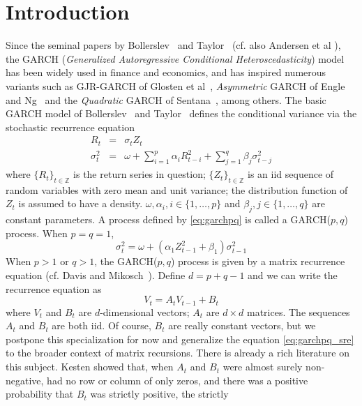 \section{Introduction}
Since the seminal papers by Bollerslev~\cite{bollerslev:1986} and 
Taylor~\cite{taylor:2008} (cf. also Andersen et al
\cite{andersen:davis:kreiss:mikosch:2009}), the GARCH 
({\em Generalized Autoregressive Conditional Heteroscedasticity}) model
has been widely used in finance and economics, and has
inspired numerous variants such as GJR-GARCH of Glosten et
al~\cite{glosten:1993}, {\em Asymmetric} GARCH of Engle and
Ng~\cite{engle:Ng:1993} and the {\em Quadratic} GARCH of
Sentana~\cite{sentana:1995}, among others. The basic GARCH model of
Bollerslev~\cite{bollerslev:1986} and Taylor~\cite{taylor:2008}
defines the conditional variance via the stochastic recurrence
equation
\begin{eqnarray}
  R_t &=& \sigma_t Z_t \nonumber \\
  \sigma_{t}^2 &=& \omega + \sum_{i=1}^p \alpha_i R_{t-i}^2 +
  \sum_{j=1}^q \beta_j \sigma_{t-j}^2   \label{eq:garchpq}
\end{eqnarray}
where $\{R_t\}_{t \in \mathbb Z}$ is the return series in question;
$\{Z_t\}_{t \in \mathbb Z}$ is an iid sequence of random variables
with zero mean and unit variance; the distribution function of $Z_t$
is assumed to have a density.
$\omega, \alpha_i, i \in \{1,\dots,p\}$ and
$\beta_j, j \in \{1,\dots,q\}$ are constant parameters. A process
defined by \eqref{eq:garchpq} is called a GARCH($p,q$) process.
When $p = q = 1$,
\[
\sigma_t^2 = \omega + (\alpha_1 Z_{t-1}^2 + \beta_1) \sigma_{t-1}^2
\]
When $p > 1$ or $q > 1$, the GARCH($p, q$) process is given by
a matrix recurrence equation (cf. Davis and
Mikosch~\cite{davis:mikosch:2001}).
Define $d = p + q - 1$ and we can write the recurrence equation as
\begin{equation}
  \label{eq:garchpq_sre}
  V_t = A_t V_{t-1} + B_t
\end{equation}
where $V_t$ and $B_t$ are $d$-dimensional vectors; $A_t$ are
$d \times d$ matrices. The sequences $A_t$ and $B_t$ are both iid.
Of course, $B_t$ are really constant vectors, but we postpone this
specialization for now and generalize the equation
\eqref{eq:garchpq_sre} to the broader context of matrix recursions.
There is already a rich literature on this subject. Kesten
\cite{kesten:1973} showed that, when $A_t$ and $B_t$ were almost
surely non-negative, had no row or column of only zeros, and there was
a positive probability that $B_t$ was strictly positive, the strictly
